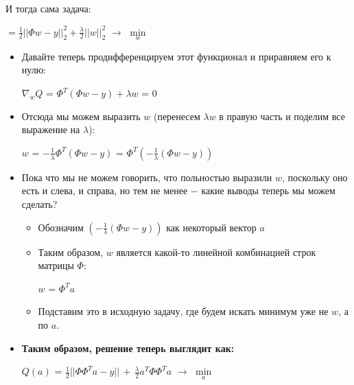             И тогда сама задача:
            \begin{center}
                \huge
                $= \frac{1}{2}||\Phi w - y||_2^2 + \frac{\lambda}{2}||w||_2^2$ $\longrightarrow$ $\min\limits_w$
            \end{center}

            \begin{itemize}
                \item  Давайте теперь продифференцируем этот функционал и приравняем его к нулю:

                \begin{center}
                    \Large
                    $\nabla_wQ$ = $\Phi^T(\Phi w - y) + \lambda w$ = $0$
                \end{center}

                \item Отсюда мы можем выразить $w$ (перенесем $\lambda w$ в правую часть и поделим все выражение на $\lambda$):

                \begin{center}
                \large
                    $w$ = $-\frac{1}{\lambda}\Phi^T(\Phi w - y)$ = $\Phi^T (-\frac{1}{\lambda}(\Phi w - y))$
                \end{center}

                \item Пока что мы не можем говорить, что польностью выразили $w$, поскольку оно есть и слева, и справа, но тем не менее $-$ какие выводы теперь мы можем сделать?
                \begin{itemize} 
                    \item Обозначим $(-\frac{1}{\lambda}(\Phi w - y))$ как некоторый вектор $a$

                    \item Таким образом, $w$ является какой-то линейной комбинацией строк матрицы $\Phi$:

                    \begin{center}
                    \Large
                        $w$ = $\Phi^Ta$
                    \end{center}

                    \item Подставим это в исходную задачу, где будем искать минимум уже не $w$, а по $a$.
                \end{itemize}

                \item \textbf{Таким образом, решение теперь выглядит как:}
                \begin{center}
                    \Large
                    $Q(a)$ = $\frac{1}{2}||\Phi\Phi^Ta - y|| \, + \, \frac{\lambda}{2}a^T\Phi\Phi^Ta$ $\longrightarrow$ $\min\limits_a$
                \end{center}


\end{itemize}
